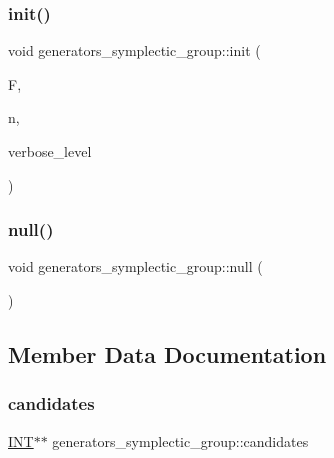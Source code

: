 \subsubsection{\texorpdfstring{init()}{init()}}
{\footnotesize\ttfamily void generators\+\_\+symplectic\+\_\+group\+::init (\begin{DoxyParamCaption}\item[{\mbox{\hyperlink{classfinite__field}{finite\+\_\+field}} $\ast$}]{F,  }\item[{\mbox{\hyperlink{galois_8h_a09fddde158a3a20bd2dcadb609de11dc}{I\+NT}}}]{n,  }\item[{\mbox{\hyperlink{galois_8h_a09fddde158a3a20bd2dcadb609de11dc}{I\+NT}}}]{verbose\+\_\+level }\end{DoxyParamCaption})}

\mbox{\label{classgenerators__symplectic__group_abf0d93022536e61263550d86959228c2}} 
\subsubsection{\texorpdfstring{null()}{null()}}
{\footnotesize\ttfamily void generators\+\_\+symplectic\+\_\+group\+::null (\begin{DoxyParamCaption}{ }\end{DoxyParamCaption})}



\subsection{Member Data Documentation}
\mbox{\label{classgenerators__symplectic__group_a27522148e4f2b668a02faae2e84a4bfc}} 
\subsubsection{\texorpdfstring{candidates}{candidates}}
{\footnotesize\ttfamily \mbox{\hyperlink{galois_8h_a09fddde158a3a20bd2dcadb609de11dc}{I\+NT}}$\ast$$\ast$ generators\+\_\+symplectic\+\_\+group\+::candidates}

